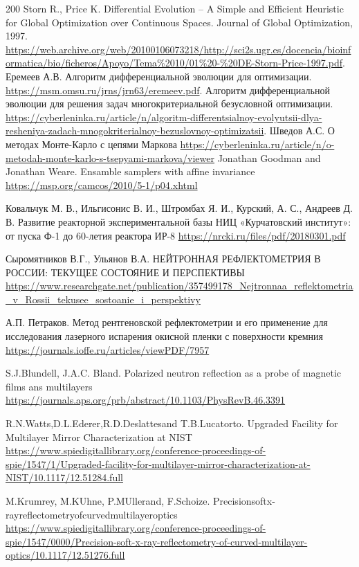 \documentclass[a4paper]{article}
\begin{document}
\begin{thebibliography}{200}
 Storn R., Price K. Differential Evolution – A Simple and Efficient Heuristic for Global Optimization over Continuous Spaces. Journal of Global Optimization, 1997. \url{https://web.archive.org/web/20100106073218/http://sci2s.ugr.es/docencia/bioinformatica/bio/ficheros/Apoyo/Tema\%2010/01\%20-\%20DE-Storn-Price-1997.pdf}.
 Еремеев А.В. Алгоритм дифференциальной эволюции для оптимизации. \url{https://msm.omsu.ru/jrns/jrn63/eremeev.pdf}.
 Алгоритм дифференциальной эволюции для решения задач многокритериальной безусловной оптимизации. \url{https://cyberleninka.ru/article/n/algoritm-differentsialnoy-evolyutsii-dlya-resheniya-zadach-mnogokriterialnoy-bezuslovnoy-optimizatsii}.
 Шведов А.С. О методах Монте-Карло с цепями Маркова \url{https://cyberleninka.ru/article/n/o-metodah-monte-karlo-s-tsepyami-markova/viewer}
 Jonathan Goodman and Jonathan Weare. Ensamble samplers with affine invariance \url{https://msp.org/camcos/2010/5-1/p04.xhtml}

 Ковальчук М. В., Ильгисонис В. И., Штромбах Я. И., Курский, А. С., Андреев Д. В. Развитие реакторной экспериментальной базы НИЦ «Курчатовский институт»: от пуска Ф-1 до 60-летия реактора ИР-8 \url{https://nrcki.ru/files/pdf/20180301.pdf}

 Сыромятников В.Г., Ульянов В.А. НЕЙТРОННАЯ РЕФЛЕКТОМЕТРИЯ В РОССИИ: ТЕКУЩЕЕ СОСТОЯНИЕ И ПЕРСПЕКТИВЫ \url{https://www.researchgate.net/publication/357499178_Nejtronnaa_reflektometria_v_Rossii_tekusee_sostoanie_i_perspektivy}

 А.П. Петраков. Метод рентгеновской рефлектометрии и его применение для исследования лазерного испарения окисной пленки 
с поверхности кремния \url{https://journals.ioffe.ru/articles/viewPDF/7957}

 S.J.Blundell, J.A.C. Bland. Polarized neutron reflection as a probe of magnetic films ans multilayers \url{https://journals.aps.org/prb/abstract/10.1103/PhysRevB.46.3391}

 R.N.Watts,D.L.Ederer,R.D.Deslattesand T.B.Lucatorto. Upgraded Facility for Multilayer Mirror Characterization at NIST
\url{https://www.spiedigitallibrary.org/conference-proceedings-of-spie/1547/1/Upgraded-facility-for-multilayer-mirror-characterization-at-NIST/10.1117/12.51284.full}

 M.Krumrey, M.KUhne, P.MUllerand, F.Schoize. Precisionsoftx-rayreflectometryofcurvedmultilayeroptics \url{https://www.spiedigitallibrary.org/conference-proceedings-of-spie/1547/0000/Precision-soft-x-ray-reflectometry-of-curved-multilayer-optics/10.1117/12.51276.full}


\end{thebibliography}
\end{document}
